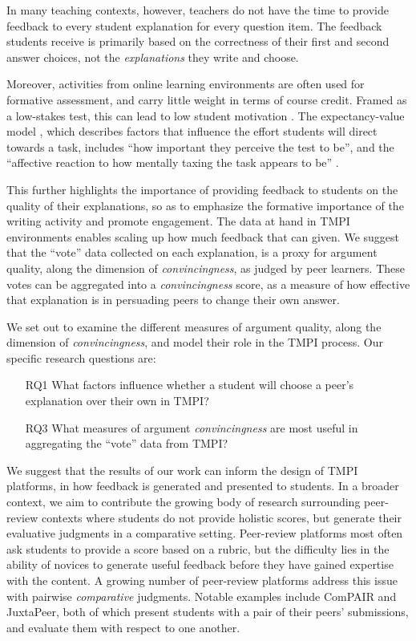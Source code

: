 \documentclass[sigconf]{acmart}
\begin{document}
In many teaching contexts, however, teachers do not have the time to provide 
feedback to every student explanation for every question item. 
The feedback students receive is primarily based on the correctness of their 
first and second answer choices, not the \textit{explanations} they write and 
choose.

Moreover, activities from online learning environments are often used for 
formative assessment, and carry little weight in terms of course credit. 
Framed as a low-stakes test, this can lead to low student motivation 
\cite{wise_low_2005}. 
The expectancy-value model \cite{pintrich_dynamic_1989}, which describes 
factors that influence the effort students will direct towards a task, includes 
``how important they perceive the test to be'', and the ``affective reaction to 
how mentally taxing the task appears to be'' \cite{wolf_consequence_1995}.

This further highlights the importance of providing feedback to students on the 
quality of their explanations, so as to emphasize the formative importance of 
the writing activity and promote engagement.
The data at hand in TMPI environments enables scaling up how much feedback that 
can given.
We suggest that the ``vote'' data collected on each explanation, is a proxy for 
argument quality, along the dimension of \textit{convincingness}, as judged by 
peer learners. 
These votes can be aggregated into a \textit{convincingness} score, as a 
measure of how effective that explanation is in persuading peers to change 
their own answer.

We set out to examine the different measures of argument quality, along the 
dimension of \textit{convincingness}, and model their role in the TMPI process. 
Our specific research questions are:
\begin{itemize}
	\item[RQ1] What factors influence whether a student will choose a peer's 
	explanation over their own in TMPI?
	\item[RQ3] What measures of argument \textit{convincingness} are most 
	useful in aggregating the ``vote'' data from TMPI?
\end{itemize}

We suggest that the results of our work can inform the design of TMPI 
platforms, in how feedback is generated and presented to students. 
In a broader context, we aim to contribute the growing body of research 
surrounding peer-review contexts where students do not provide holistic scores, 
but generate their evaluative judgments in a comparative setting.
Peer-review platforms most often ask students to provide a score based on a 
rubric, but the difficulty lies in the ability of novices to generate useful 
feedback before they have gained expertise with the content. 
A growing number of peer-review platforms address this issue with pairwise
\textit{comparative} judgments.
Notable examples include ComPAIR\cite{potter_compair:_2017} and 
JuxtaPeer\cite{cambre_juxtapeer:_2018}, both of which present students with a 
pair of their peers' submissions, and evaluate them with respect to one another.
\end{document}
